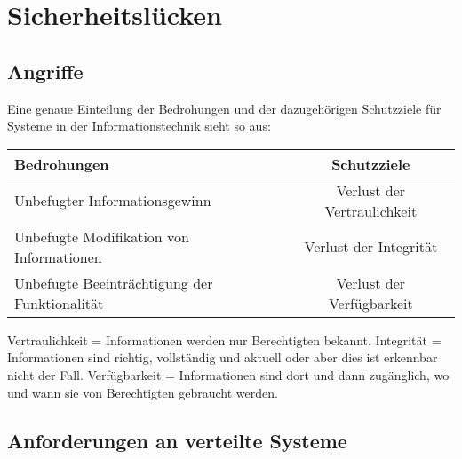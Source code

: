 \chapter{Sicherheitslücken}\label{Sicherheitsluecken}
\section{Angriffe}


Eine genaue Einteilung der Bedrohungen und der dazugehörigen Schutzziele für Systeme in der Informationstechnik sieht so aus:

\begin{tabular}[h]{l|c}
    Bedrohungen & Schutzziele \\
    \hline
    Unbefugter Informationsgewinn & Verlust der Vertraulichkeit \\
    Unbefugte Modifikation von Informationen & Verlust der Integrität \\
    Unbefugte Beeinträchtigung der Funktionalität & Verlust der Verfügbarkeit \\
\end{tabular}


Vertraulichkeit = Informationen werden nur Berechtigten bekannt.
\newline
Integrität = Informationen sind richtig, vollständig und aktuell
oder aber dies ist erkennbar nicht der Fall.
\newline
Verfügbarkeit = Informationen sind dort und dann zugänglich,
wo und wann sie von Berechtigten gebraucht werden.

\section{Anforderungen an verteilte Systeme}